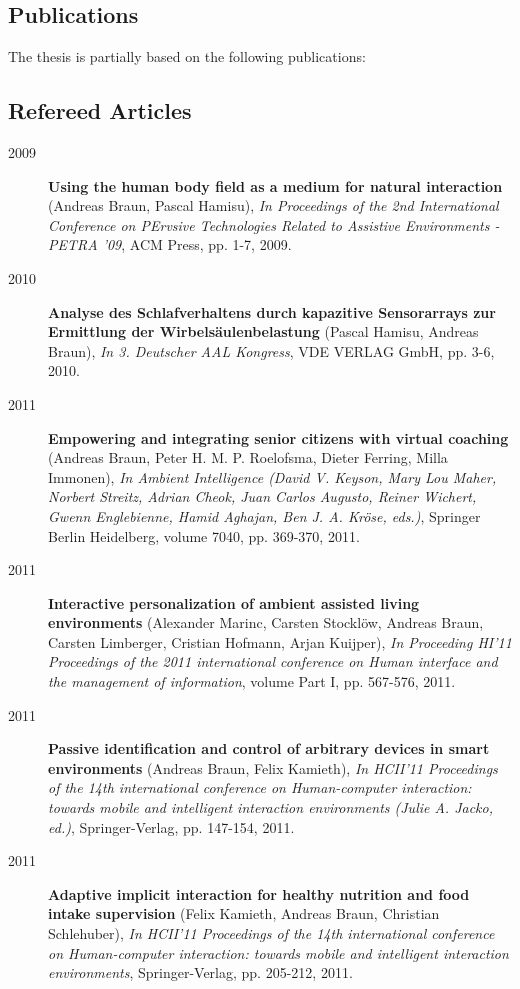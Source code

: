 \begin{appendix}


\chapter{Publications}
The thesis is partially based on the following publications:

\section*{Refereed Articles}
\begin{description}
\item[2009]{\bf Using the human body field as a medium for natural interaction} (Andreas Braun, Pascal Hamisu), {\em In Proceedings of the 2nd International Conference on PErvsive Technologies Related to Assistive Environments - PETRA '09}, ACM Press, pp. 1-7, 2009.
\item[2010]{\bf Analyse des Schlafverhaltens durch kapazitive Sensorarrays zur Ermittlung der Wirbelsäulenbelastung} (Pascal Hamisu, Andreas Braun), {\em In 3. Deutscher AAL Kongress}, VDE VERLAG GmbH, pp. 3-6, 2010.
\item[2011]{\bf Empowering and integrating senior citizens with virtual coaching} (Andreas Braun, Peter H. M. P. Roelofsma, Dieter Ferring, Milla Immonen), {\em In Ambient Intelligence (David V. Keyson, Mary Lou Maher, Norbert Streitz, Adrian Cheok, Juan Carlos Augusto, Reiner Wichert, Gwenn Englebienne, Hamid Aghajan, Ben J. A. Kröse, eds.)}, Springer Berlin Heidelberg, volume 7040, pp. 369-370, 2011.
\item[2011]{\bf Interactive personalization of ambient assisted living environments} (Alexander Marinc, Carsten Stocklöw, Andreas Braun, Carsten Limberger, Cristian Hofmann, Arjan Kuijper), {\em In Proceeding HI'11 Proceedings of the 2011 international conference on Human interface and the management of information}, volume Part I, pp. 567-576, 2011.
\item[2011]{\bf Passive identification and control of arbitrary devices in smart environments} (Andreas Braun, Felix Kamieth), {\em In HCII'11 Proceedings of the 14th international conference on Human-computer interaction: towards mobile and intelligent interaction environments (Julie A. Jacko, ed.)}, Springer-Verlag, pp. 147-154, 2011.
\item[2011]{\bf Adaptive implicit interaction for healthy nutrition and food intake supervision} (Felix Kamieth, Andreas Braun, Christian Schlehuber), {\em In HCII'11 Proceedings of the 14th international conference on Human-computer interaction: towards mobile and intelligent interaction environments}, Springer-Verlag, pp. 205-212, 2011.

\end{description}
\end{appendix}
